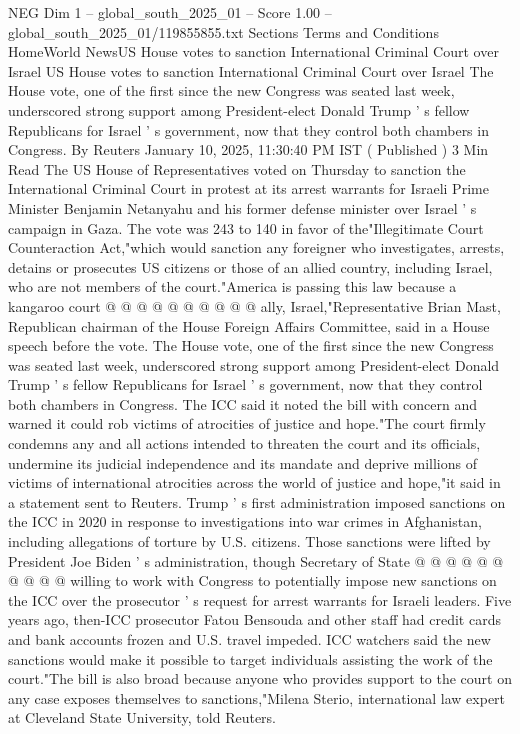 \begin{textsample}{NEG Dim 1 – global\_south\_2025\_01 – Score 1.00 – global\_south\_2025\_01/119855855.txt}  \label{ex:f1_neg_152}
Sections Terms and Conditions HomeWorld NewsUS House votes to sanction International Criminal Court over Israel US House votes to sanction International Criminal Court over Israel The House vote, one of the first since the new Congress was seated last week, underscored strong support among President-elect Donald Trump ' s fellow Republicans for Israel ' s government, now that they control both chambers in Congress.
By Reuters January 10, 2025, 11:30:40 PM IST ( Published ) 3 Min Read The US House of Representatives voted on Thursday to sanction the International Criminal Court in protest at its arrest warrants for Israeli Prime Minister Benjamin Netanyahu and his former defense minister over Israel ' s campaign in Gaza.
The vote was 243 to 140 in favor of the"Illegitimate Court Counteraction Act,"which would sanction any foreigner who investigates, arrests, detains or prosecutes US citizens or those of an allied country, including Israel, who are not members of the court."America is passing this law because a kangaroo court @ @ @ @ @ @ @ @ @ @ ally, Israel,"Representative Brian Mast, Republican chairman of the House Foreign Affairs Committee, said in a House speech before the vote.
The House vote, one of the first since the new Congress was seated last week, underscored strong support among President-elect Donald Trump ' s fellow Republicans for Israel ' s government, now that they control both chambers in Congress.
The ICC said it noted the bill with concern and warned it could rob victims of atrocities of justice and hope."The court firmly condemns any and all actions intended to threaten the court and its officials, undermine its judicial independence and its mandate and deprive millions of victims of international atrocities across the world of justice and hope,"it said in a statement sent to Reuters.
Trump ' s first administration imposed sanctions on the ICC in 2020 in response to investigations into war crimes in Afghanistan, including allegations of torture by U.S. citizens.
Those sanctions were lifted by President Joe Biden ' s administration, though Secretary of State @ @ @ @ @ @ @ @ @ @ willing to work with Congress to potentially impose new sanctions on the ICC over the prosecutor ' s request for arrest warrants for Israeli leaders.
Five years ago, then-ICC prosecutor Fatou Bensouda and other staff had credit cards and bank accounts frozen and U.S. travel impeded.
ICC watchers said the new sanctions would make it possible to target individuals assisting the work of the court."The bill is also broad because anyone who provides support to the court on any case exposes themselves to sanctions,"Milena Sterio, international law expert at Cleveland State University, told Reuters.

\end{textsample}
